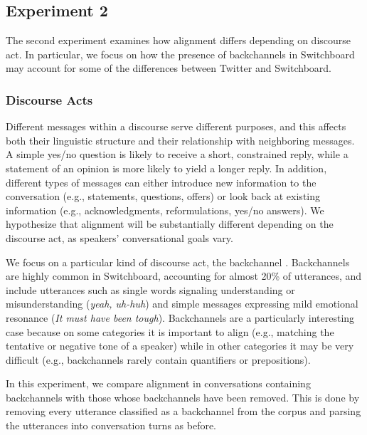 \documentclass[11pt]{article}
\begin{document}
\subsection{Experiment 2}

The second experiment examines how alignment differs depending on discourse act. In particular, we focus on how the presence of backchannels in Switchboard may account for some of the differences between Twitter and Switchboard.

\subsubsection{Discourse Acts}
Different messages within a discourse serve different purposes, and this affects both their linguistic structure and their relationship with neighboring messages.  A simple yes/no question is likely to receive a short, constrained reply, while a statement of an opinion is more likely to yield a longer reply. In addition, different types of messages can either introduce new information to the conversation (e.g., statements, questions, offers) or look back at existing information (e.g., acknowledgments, reformulations, yes/no answers). We hypothesize that alignment will be substantially different depending on the discourse act, as speakers' conversational goals vary.

We focus on a particular kind of discourse act, the backchannel \cite{Yngve1970}. Backchannels are highly common in Switchboard, accounting for almost 20\% of utterances, and include utterances such as single words signaling understanding or misunderstanding (\textit{yeah, uh-huh}) and simple messages expressing mild emotional resonance (\textit{It must have been tough}).  Backchannels are a particularly interesting case because on some categories it is important to align (e.g., matching the tentative or negative tone of a speaker) while in other categories it may be very difficult (e.g., backchannels rarely contain quantifiers or prepositions).

In this experiment, we compare alignment in conversations containing backchannels with those whose backchannels have been removed. This is done by removing every utterance classified as a backchannel from the corpus and parsing the utterances into conversation turns as before.
\end{document}
